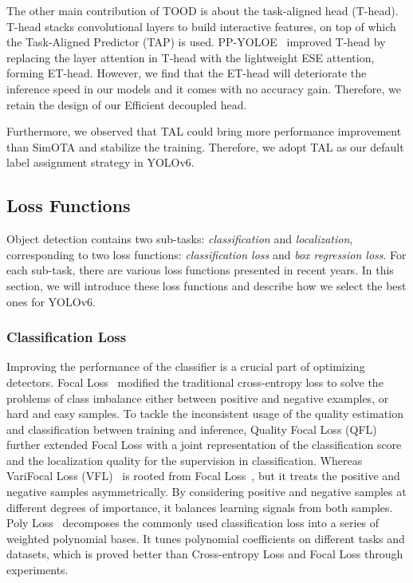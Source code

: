 \documentclass[10pt,twocolumn,letterpaper]{article}
\begin{document}
 The other main contribution of TOOD is about the task-aligned head (T-head). T-head stacks convolutional layers to build interactive features, on top of which the Task-Aligned Predictor (TAP) is used. PP-YOLOE~\cite{xu2022ppyoloe} improved T-head by replacing the layer attention in T-head with the lightweight ESE attention, forming ET-head. However, we find that the ET-head will deteriorate the inference speed in our models and it comes with no accuracy gain. Therefore, we retain the design of our Efficient decoupled head.
 
 Furthermore, we observed that TAL could bring more performance improvement than SimOTA and stabilize the training. Therefore, we adopt TAL as our default label assignment strategy in YOLOv6.




  \subsection{Loss Functions}
  Object detection contains two sub-tasks: \emph{classification} and \emph{localization}, corresponding to two loss functions: \emph{classification loss} and \emph{box regression loss}. For each sub-task, there are various loss functions presented in recent years. In this section, we will introduce these loss functions and describe how we select the best ones for YOLOv6.





  \subsubsection{Classification Loss}
  Improving the performance of the classifier is a crucial part of optimizing detectors. Focal Loss~\cite{lin2017focal} modified the traditional cross-entropy loss to solve the problems of class imbalance either between positive and negative examples, or hard and easy samples. To tackle the inconsistent usage of the quality estimation and classification between training and inference, Quality Focal Loss (QFL)~\cite{li2020generalized} further extended Focal Loss with a joint representation of the classification score and the localization quality for the supervision in classification. Whereas VariFocal Loss (VFL)~\cite{zhang2021varifocalnet} is rooted from Focal Loss~\cite{lin2017focal}, but it treats the positive and negative samples asymmetrically. By considering positive and negative samples at different degrees of importance, it balances learning signals from both samples.
  Poly Loss~\cite{leng2022polyloss} decomposes the commonly used classification loss into a series of weighted polynomial bases. It tunes polynomial coefficients on different tasks and datasets, which is proved better than Cross-entropy Loss and Focal Loss through experiments.
  
\end{document}
